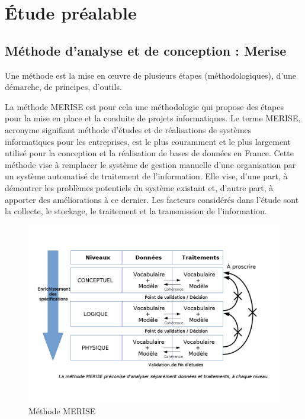 \chapter{Étude préalable} \label{Chapter2}

\section{Méthode d’analyse et de conception : Merise}
Une méthode est la mise en œuvre de plusieurs étapes (méthodologiques), d'une démarche, de principes, d'outils.

La méthode MERISE est pour cela une méthodologie qui propose des étapes pour la mise en place et la conduite de projets informatiques. Le terme MERISE, acronyme signifiant méthode d'études et de réalisations de systèmes informatiques pour les entreprises, est le plus couramment et le plus largement utilisé pour la conception et la réalisation de bases de données en France.
Cette méthode vise à remplacer le système de gestion manuelle d'une organisation par un système automatisé de traitement de l'information. Elle vise, d'une part, à démontrer les problèmes potentiels du système existant et, d'autre part, à apporter des améliorations à ce dernier. Les facteurs considérés dans l'étude sont la collecte, le stockage, le traitement et la transmission de l'information.

\begin{figure}[ht!]
    \centering
    \includegraphics[keepaspectratio=true,scale=0.3]{Figures/merise.png}
    \caption{Méthode MERISE}
    \label{fig:merise}
\end{figure}

